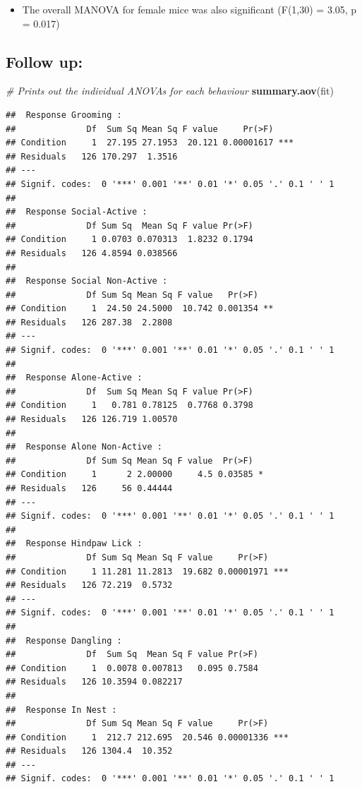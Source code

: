 \documentclass[
]{book}
\newenvironment{Shaded}{\begin{snugshade}}{\end{snugshade}}
\newcommand{\CommentTok}[1]{\textcolor[rgb]{0.56,0.35,0.01}{\textit{#1}}}
\newcommand{\FunctionTok}[1]{\textcolor[rgb]{0.13,0.29,0.53}{\textbf{#1}}}
\newcommand{\NormalTok}[1]{#1}
\providecommand{\tightlist}{%
  \setlength{\itemsep}{0pt}\setlength{\parskip}{0pt}}
\begin{document}
\begin{itemize}
\tightlist
\item
  The overall MANOVA for female mice was also significant (F(1,30) = 3.05, p = 0.017)
\end{itemize}

\hypertarget{follow-up}{%
\subsection{Follow up:}\label{follow-up}}

\begin{Shaded}
\begin{Highlighting}[]
\CommentTok{\# Prints out the individual ANOVAs for each behaviour}
\FunctionTok{summary.aov}\NormalTok{(fit)}
\end{Highlighting}
\end{Shaded}

\begin{verbatim}
##  Response Grooming :
##              Df  Sum Sq Mean Sq F value     Pr(>F)    
## Condition     1  27.195 27.1953  20.121 0.00001617 ***
## Residuals   126 170.297  1.3516                       
## ---
## Signif. codes:  0 '***' 0.001 '**' 0.01 '*' 0.05 '.' 0.1 ' ' 1
## 
##  Response Social-Active :
##              Df Sum Sq  Mean Sq F value Pr(>F)
## Condition     1 0.0703 0.070313  1.8232 0.1794
## Residuals   126 4.8594 0.038566               
## 
##  Response Social Non-Active :
##              Df Sum Sq Mean Sq F value   Pr(>F)   
## Condition     1  24.50 24.5000  10.742 0.001354 **
## Residuals   126 287.38  2.2808                    
## ---
## Signif. codes:  0 '***' 0.001 '**' 0.01 '*' 0.05 '.' 0.1 ' ' 1
## 
##  Response Alone-Active :
##              Df  Sum Sq Mean Sq F value Pr(>F)
## Condition     1   0.781 0.78125  0.7768 0.3798
## Residuals   126 126.719 1.00570               
## 
##  Response Alone Non-Active :
##              Df Sum Sq Mean Sq F value  Pr(>F)  
## Condition     1      2 2.00000     4.5 0.03585 *
## Residuals   126     56 0.44444                  
## ---
## Signif. codes:  0 '***' 0.001 '**' 0.01 '*' 0.05 '.' 0.1 ' ' 1
## 
##  Response Hindpaw Lick :
##              Df Sum Sq Mean Sq F value     Pr(>F)    
## Condition     1 11.281 11.2813  19.682 0.00001971 ***
## Residuals   126 72.219  0.5732                       
## ---
## Signif. codes:  0 '***' 0.001 '**' 0.01 '*' 0.05 '.' 0.1 ' ' 1
## 
##  Response Dangling :
##              Df  Sum Sq  Mean Sq F value Pr(>F)
## Condition     1  0.0078 0.007813   0.095 0.7584
## Residuals   126 10.3594 0.082217               
## 
##  Response In Nest :
##              Df Sum Sq Mean Sq F value     Pr(>F)    
## Condition     1  212.7 212.695  20.546 0.00001336 ***
## Residuals   126 1304.4  10.352                       
## ---
## Signif. codes:  0 '***' 0.001 '**' 0.01 '*' 0.05 '.' 0.1 ' ' 1
\end{verbatim}
\end{document}
